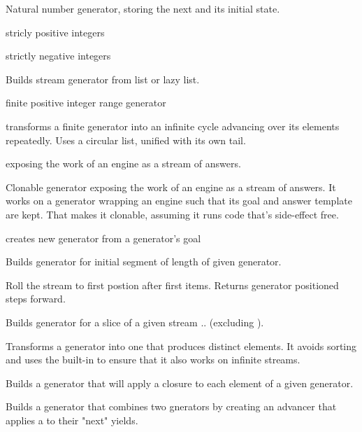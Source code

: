 \documentclass[11pt]{article}
\begin{document}
\begin{description}
Natural number generator, storing the next and its initial state.

stricly positive integers

strictly negative integers

Builds stream generator from list or lazy list. 

finite positive integer range generator

transforms a finite generator into an infinite cycle
advancing over its elements repeatedly.
Uses a circular list, unified with its own tail.

 exposing the work of an engine as a stream of answers. 

Clonable generator exposing the work of an engine as a stream of answers.
It works on a generator wrapping an engine
such that its goal and answer template are kept.
That makes it clonable, assuming it runs code that's side-effect free.

creates new generator from a generator's goal

Builds generator for initial segment of length  of given generator. 

Roll the stream to first postion after first  items.
Returns generator positioned  steps forward.

Builds generator for a slice of a given stream .. (excluding ).

Transforms a generator into one that produces distinct elements.
It avoids sorting and uses the built-in  to ensure
that it also works on infinite streams.

Builds a generator that will apply a closure to each element of a given generator.

Builds a generator that combines two gnerators by creating
an advancer that applies a  to their "next" yields.


\end{description}
\end{document}

